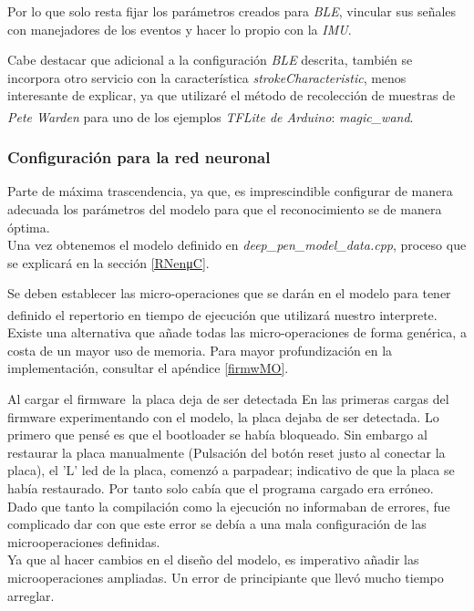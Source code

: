 Por lo que solo resta fijar los parámetros creados para \textit{BLE},
vincular sus señales con manejadores de los eventos y hacer lo propio
con la \textit{IMU}.

Cabe destacar que adicional a la configuración \textit{BLE} descrita, también
se incorpora otro servicio con la característica \textit{strokeCharacteristic},
menos interesante de explicar, ya que utilizaré el método de recolección de
muestras de \textit{Pete Warden} para uno de los ejemplos
\textit{TFLite de Arduino}: \textit{magic\_wand}\textsuperscript{\cite{petewardenmw}}.

\subsubsection{Configuración para la red neuronal}
Parte de máxima trascendencia, ya que, es imprescindible configurar de
manera adecuada los parámetros del modelo para que el reconocimiento
se de manera óptima.\\
Una vez obtenemos el modelo definido en \textit{deep\_pen\_model\_data.cpp},
proceso que se explicará en la sección \ref{RNenμC}.

Se deben establecer las micro-operaciones que se darán en el modelo
para tener definido el repertorio en tiempo de ejecución que utilizará
nuestro interprete\textsuperscript{\cite{intro-tensor-micro}}.
Existe una alternativa que añade todas las micro-operaciones de forma genérica,
a costa de un mayor uso de memoria. Para mayor profundización en la
implementación, consultar el apéndice \ref{firmwMO}.

\begin{problemas}{Al cargar el firmware\, la placa deja de ser detectada}
    En las primeras cargas del firmware experimentando con el modelo, la placa
    dejaba de ser detectada. Lo primero que pensé es que el bootloader se había
    bloqueado. Sin embargo al restaurar la placa manualmente ({\small Pulsación
    del botón reset justo al conectar la placa}), el 'L' led de la placa,
    comenzó a parpadear; indicativo de que la placa se había restaurado.
    Por tanto solo cabía que el programa cargado era erróneo.
    Dado que tanto la compilación como la ejecución no informaban de errores,
    fue complicado dar con que este error se debía a una mala configuración
    de las microoperaciones definidas.\\Ya que al hacer cambios en el diseño
    del modelo, es imperativo añadir las microoperaciones ampliadas.
    Un error de principiante que llevó mucho tiempo arreglar.
\end{problemas}

